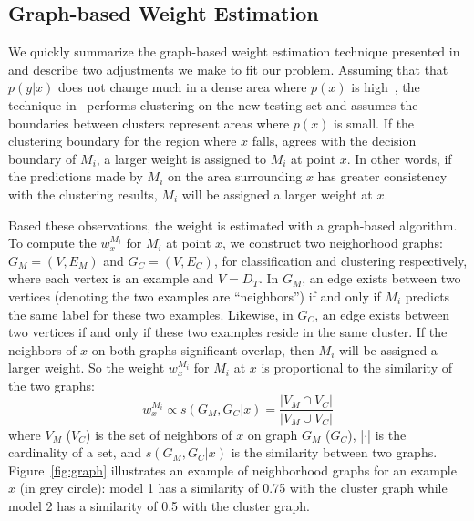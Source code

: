 \subsection{Graph-based Weight Estimation}\label{sec:gwe}
We quickly summarize the graph-based weight estimation technique presented in~\cite{lwe} and describe two adjustments we make to fit our problem.
Assuming that that $p(y|x)$ does not change much in a dense area where $p(x)$ is high~\cite{cluster}, 
the technique in~\cite{lwe} performs clustering on the new testing set and assumes the boundaries between clusters represent areas where $p(x)$ is small.
If the clustering boundary for the region where $x$ falls, agrees with the decision boundary of $M_i$, 
a larger weight is assigned to $M_i$ at point $x$.
In other words, if the predictions made by $M_i$ on the area surrounding $x$ has greater consistency with the clustering results, $M_i$ will be assigned
a larger weight at $x$. 

Based these observations, the weight is estimated with a graph-based algorithm.
To compute the $w_{x}^{M_i}$ for $M_i$ at point $x$, we construct two neighorhood graphs: 
$G_M = (V, E_M)$ and $G_C = (V, E_C)$, for classification and clustering respectively, 
where each vertex is an example and $V = D_T$. In $G_M$, an edge exists between two vertices (denoting the two examples are ``neighbors'') if and only if $M_i$ predicts the same label for these two examples. Likewise, in $G_C$, an edge exists between two vertices if and only if these two examples reside in the same cluster.
If the neighbors of $x$ on both graphs significant overlap, then $M_i$ will be assigned a larger weight.
So the weight $w_{x}^{M_i}$ for $M_i$ at $x$ is proportional to the similarity of the two graphs:
\begin{equation}\label{eq_sim}
w_{x}^{M_i} \propto s(G_M, G_C|x) = \frac {|V_M \cap V_C|} {|V_M \cup V_C|}
\end{equation}
where $V_M$ ($V_C$) is the set of neighbors of $x$ on graph $G_M$ ($G_C$), |$\cdot$| is the cardinality of a set, and $s(G_M, G_C|x)$ is the similarity between two graphs. 
Figure~\ref{fig:graph} illustrates an example of neighborhood graphs for an example $x$ (in grey circle): model 1 has a similarity of 0.75 with the cluster graph
 while model 2 has a similarity of 0.5 with the cluster graph.

